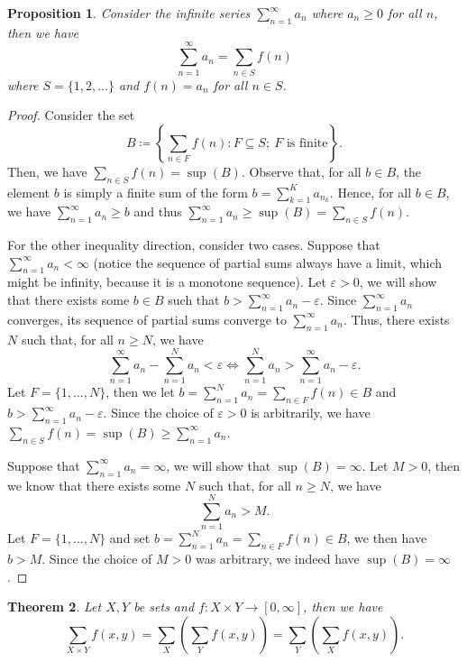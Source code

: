 \documentclass[11pt]{article} %
\theoremstyle{plain}
\newtheorem{thm}{Theorem}[section]
\newtheorem{proposition}[thm]{Proposition}
\begin{document}
\begin{proposition}
Consider the infinite series $\sum_{n=1}^\infty a_n$ where $a_n\geq 0$ for all $n$, then we have
\[\sum_{n=1}^\infty a_n = \sum_{n\in S} f(n)\]
where $S = \{1,2,\ldots\}$ and $f(n)=a_n$ for all $n\in S$.
\end{proposition}

\begin{proof}
Consider the set
\[B \coloneqq \left\{\sum_{n\in F}f(n): F\subseteq S;\ F\text{ is finite}\right\}.\]
Then, we have $\sum_{n\in S} f(n) = \sup(B)$. Observe that, for all $b\in B$, the element $b$ is simply a finite sum of the form $b = \sum_{k=1}^K a_{n_k}$. Hence, for all $b\in B$, we have $\sum_{n=1}^\infty a_n\geq b$ and thus $\sum_{n=1}^\infty a_n\geq \sup(B) = \sum_{n\in S} f(n)$.

For the other inequality direction, consider two cases. Suppose that $\sum_{n=1}^{\infty} a_n <\infty$ (notice the sequence of partial sums always have a limit, which might be infinity, because it is a monotone sequence). Let $\varepsilon>0$, we will show that there exists some $b\in B$ such that $b > \sum_{n=1}^\infty a_n - \varepsilon$. Since $\sum_{n=1}^\infty a_n$ converges, its sequence of partial sums converge to $\sum_{n=1}^\infty a_n$. Thus, there exists $N$ such that, for all $n\geq N$, we have
\[\sum_{n=1}^\infty a_n-\sum_{n=1}^N a_n < \varepsilon \iff \sum_{n=1}^N a_n > \sum_{n=1}^\infty a_n-\varepsilon.\]
Let $F = \{1,\ldots,N\}$, then we let $b=\sum_{n=1}^N a_n= \sum_{n\in F} f(n)\in B$ and $b>\sum_{n=1}^\infty a_n-\varepsilon$. Since the choice of $\varepsilon>0$ is arbitrarily, we have $\sum_{n\in S} f(n)=\sup(B)\geq \sum_{n=1}^\infty a_n$.

Suppose that $\sum_{n=1}^\infty a_n = \infty$, we will show that $\sup(B) = \infty$. Let $M>0$, then we know that there exists some $N$ such that, for all $n\geq N$, we have
\[\sum_{n=1}^N a_n > M.\]
Let $F= \{1,\ldots,N\}$ and set $b = \sum_{n=1}^N a_n  = \sum_{n\in F}f(n)\in B$, we then have $b>M$. Since the choice of $M>0$ was arbitrary, we indeed have $\sup(B)=\infty$.
\end{proof}

\begin{thm}
Let $X,Y$ be sets and $f \colon X\times Y \to [0,\infty]$, then we have
\[\sum_{X\times Y}f(x,y) = \sum_X \left(\sum_Y f(x,y)\right) = \sum_Y \left(\sum_X f(x,y)\right).\]
\end{thm}
\end{document}
